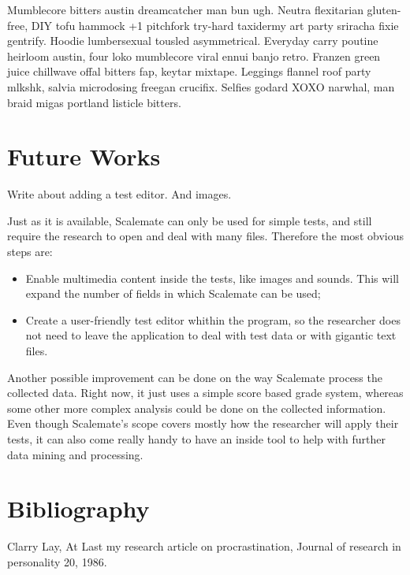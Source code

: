 \documentclass[12pt, a4paper, twoside]{article}
\begin{document}
Mumblecore bitters austin dreamcatcher man bun ugh. Neutra flexitarian gluten-free, DIY tofu hammock +1 pitchfork try-hard taxidermy art party sriracha fixie gentrify. Hoodie lumbersexual tousled asymmetrical. Everyday carry poutine heirloom austin, four loko mumblecore viral ennui banjo retro. Franzen green juice chillwave offal bitters fap, keytar mixtape. Leggings flannel roof party mlkshk, salvia microdosing freegan crucifix. Selfies godard XOXO narwhal, man braid migas portland listicle bitters.

\section{Future Works}

Write about adding a test editor. And images.

Just as it is available, Scalemate can only be used for simple tests, and still require the research to open and deal with many files. Therefore the most obvious steps are:
\begin{itemize}
	\item Enable multimedia content inside the tests, like images and sounds. This will expand the number of fields in which Scalemate can be used;
	\item Create a user-friendly test editor whithin the program, so the researcher does not need to leave the application to deal with test data or with gigantic text files.
\end{itemize}

Another possible improvement can be done on the way Scalemate process the collected data. Right now, it just uses a simple score based grade system, whereas some other more complex analysis could be done on the collected information. Even though Scalemate's scope covers mostly how the researcher will apply their tests, it can also come really handy to have an inside tool to help with further data mining and processing.

\section{Bibliography}

\begin{thebibliography}{9}

		Clarry Lay,
		At Last my research article on procrastination,
		Journal of research in personality 20,
		1986.

\end{thebibliography}
\end{document}
